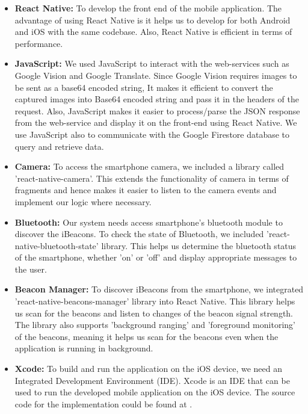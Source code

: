 \documentclass[12pt]{article}
\begin{document}
\begin{itemize}
  \item \textbf{React Native:} To develop the front end of the mobile application. The advantage of using React Native is it helps us to develop for both Android and iOS with the same codebase. Also, React Native is efficient in terms of performance.
  
   \item \textbf{JavaScript:} We used JavaScript to interact with the web-services such as Google Vision and Google Translate. Since Google Vision requires images to be sent as a base64 encoded string, It makes it efficient to convert the captured images into Base64 encoded string and pass it in the headers of the request. Also, JavaScript makes it easier to process/parse the JSON response from the web-service and display it on the front-end using React Native. We use JavaScript also to communicate with the Google Firestore database to query and retrieve data.
  
      \item \textbf{Camera:} To access the smartphone camera, we included a library called 'react-native-camera'. This extends the functionality of camera in terms of fragments and hence makes it easier to listen to the camera events and implement our logic where necessary.
      
        \item \textbf{Bluetooth:} Our system needs access smartphone's bluetooth module to discover the iBeacons. To check the state of Bluetooth, we included 'react-native-bluetooth-state' library. This helps us determine the bluetooth status of the smartphone, whether 'on' or 'off' and display appropriate messages to the user.
        
        \item \textbf{Beacon Manager:} To discover iBeacons from the smartphone, we integrated 'react-native-beacons-manager' library into React Native. This library helps us scan for the beacons and listen to changes of the beacon signal strength. The library also supports 'background ranging' and 'foreground monitoring' of the beacons, meaning it helps us scan for the beacons even when the application is running in background. 
      
      \item \textbf{Xcode:} To build and run the application on the iOS device, we need an Integrated Development Environment (IDE). Xcode is an IDE that can be used to run the developed mobile application on the iOS device. The source code for the implementation could be found at \cite{git}.
      
 \end{itemize}
 
\end{document}
